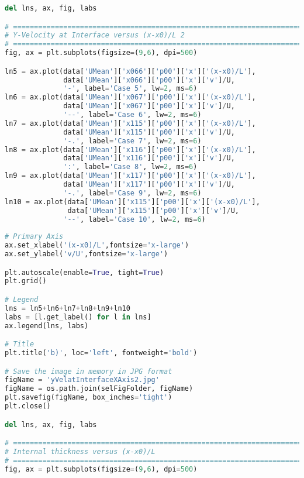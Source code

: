 \begin{lstlisting}[language=python]
del lns, ax, fig, labs

# =============================================================================
# Y-Velocity at Interface versus (x-x0)/L 2
# =============================================================================
fig, ax = plt.subplots(figsize=(9,6), dpi=500)

ln5 = ax.plot(data['UMean']['x066']['p00']['x']['(x-x0)/L'],
              data['UMean']['x066']['p00']['x']['v']/U,
              '-', label='Case 5', lw=2, ms=6)
ln6 = ax.plot(data['UMean']['x067']['p00']['x']['(x-x0)/L'],
              data['UMean']['x067']['p00']['x']['v']/U,
              '--', label='Case 6', lw=2, ms=6)
ln7 = ax.plot(data['UMean']['x115']['p00']['x']['(x-x0)/L'],
              data['UMean']['x115']['p00']['x']['v']/U,
              '-.', label='Case 7', lw=2, ms=6)
ln8 = ax.plot(data['UMean']['x116']['p00']['x']['(x-x0)/L'],
              data['UMean']['x116']['p00']['x']['v']/U,
              ':', label='Case 8', lw=2, ms=6)
ln9 = ax.plot(data['UMean']['x117']['p00']['x']['(x-x0)/L'],
              data['UMean']['x117']['p00']['x']['v']/U,
              '-.', label='Case 9', lw=2, ms=6)
ln10 = ax.plot(data['UMean']['x115']['p00']['x']['(x-x0)/L'],
               data['UMean']['x115']['p00']['x']['v']/U,
              '--', label='Case 10', lw=2, ms=6)
    
# Primary Axis
ax.set_xlabel('(x-x0)/L',fontsize='x-large')
ax.set_ylabel('v/U',fontsize='x-large')

plt.autoscale(enable=True, tight=True)
plt.grid()

# Legend
lns = ln5+ln6+ln7+ln8+ln9+ln10
labs = [l.get_label() for l in lns]
ax.legend(lns, labs)

# Title
plt.title('b)', loc='left', fontweight='bold')

# Save the image in memory in JPG format
figName = 'yVelatInterfaceXAxis2.jpg'
figName = os.path.join(selFigFolder, figName)
plt.savefig(figName, box_inches='tight')
plt.close()

del lns, ax, fig, labs

# =============================================================================
# Internal thickness versus (x-x0)/L
# =============================================================================
fig, ax = plt.subplots(figsize=(9,6), dpi=500)


\end{lstlisting}
